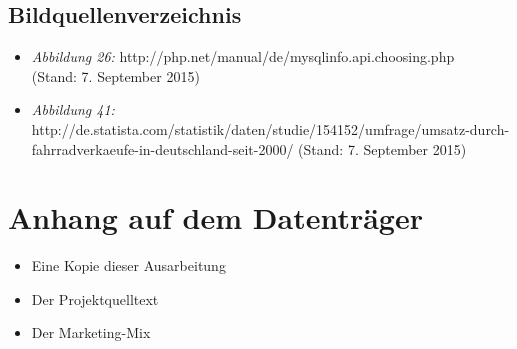 \subsection*{Bildquellenverzeichnis}
\begin{itemize}
	\item \textit{Abbildung 26:} http://php.net/manual/de/mysqlinfo.api.choosing.php\\ (Stand: 7. September 2015)
	\item \textit{Abbildung 41:} http://de.statista.com/statistik/daten/studie/154152/umfrage/umsatz-durch-fahrradverkaeufe-in-deutschland-seit-2000/ (Stand: 7. September 2015)
\end{itemize}

\section{Anhang auf dem Datenträger}
\begin{itemize}
	\item Eine Kopie dieser Ausarbeitung
	\item Der Projektquelltext
	\item Der Marketing-Mix
\end{itemize}